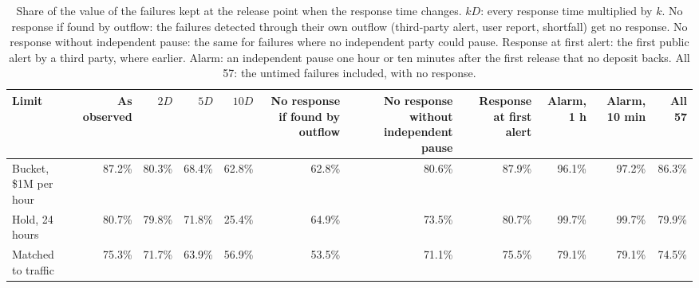 \begin{table}[t]
\centering
\caption{Share of the value of the failures kept at the release point when the response time changes. $kD$: every response time multiplied by $k$. No response if found by outflow: the failures detected through their own outflow (third-party alert, user report, shortfall) get no response. No response without independent pause: the same for failures where no independent party could pause. Response at first alert: the first public alert by a third party, where earlier. Alarm: an independent pause one hour or ten minutes after the first release that no deposit backs. All 57: the untimed failures included, with no response.}
\label{tab:response}
\footnotesize
\setlength{\tabcolsep}{2.5pt}
\begin{tabular}{@{}l r r r r r r r r r r @{}}
\toprule
Limit & \multicolumn{1}{p{1.3cm}}{\raggedleft As observed} & \multicolumn{1}{p{1.3cm}}{\raggedleft $2D$} & \multicolumn{1}{p{1.3cm}}{\raggedleft $5D$} & \multicolumn{1}{p{1.3cm}}{\raggedleft $10D$} & \multicolumn{1}{p{1.3cm}}{\raggedleft No response if found by outflow} & \multicolumn{1}{p{1.3cm}}{\raggedleft No response without independent pause} & \multicolumn{1}{p{1.3cm}}{\raggedleft Response at first alert} & \multicolumn{1}{p{1.3cm}}{\raggedleft Alarm, 1 h} & \multicolumn{1}{p{1.3cm}}{\raggedleft Alarm, 10 min} & \multicolumn{1}{p{1.3cm}}{\raggedleft All 57} \\
\midrule
Bucket, \$1M per hour & 87.2\% & 80.3\% & 68.4\% & 62.8\% & 62.8\% & 80.6\% & 87.9\% & 96.1\% & 97.2\% & 86.3\% \\
Hold, 24 hours & 80.7\% & 79.8\% & 71.8\% & 25.4\% & 64.9\% & 73.5\% & 80.7\% & 99.7\% & 99.7\% & 79.9\% \\
Matched to traffic & 75.3\% & 71.7\% & 63.9\% & 56.9\% & 53.5\% & 71.1\% & 75.5\% & 79.1\% & 79.1\% & 74.5\% \\
\bottomrule
\end{tabular}
\end{table}
